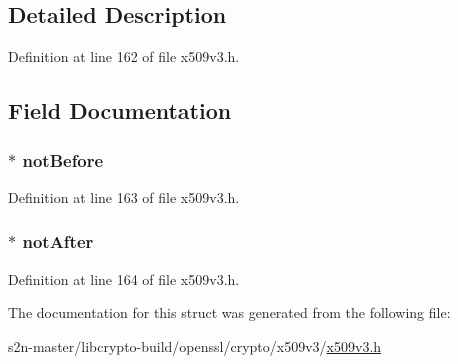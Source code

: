 \subsection{Detailed Description}


Definition at line 162 of file x509v3.\+h.



\subsection{Field Documentation}
\subsubsection[{\texorpdfstring{not\+Before}{notBefore}}]{ $\ast$ not\+Before}\hypertarget{struct_p_k_e_y___u_s_a_g_e___p_e_r_i_o_d__st_a1f4540963c9c687c144bd3125d351f50}{}\label{struct_p_k_e_y___u_s_a_g_e___p_e_r_i_o_d__st_a1f4540963c9c687c144bd3125d351f50}


Definition at line 163 of file x509v3.\+h.

\subsubsection[{\texorpdfstring{not\+After}{notAfter}}]{ $\ast$ not\+After}\hypertarget{struct_p_k_e_y___u_s_a_g_e___p_e_r_i_o_d__st_a2edd51bc270d6c8a89d3f455d91b90a8}{}\label{struct_p_k_e_y___u_s_a_g_e___p_e_r_i_o_d__st_a2edd51bc270d6c8a89d3f455d91b90a8}


Definition at line 164 of file x509v3.\+h.



The documentation for this struct was generated from the following file\+:\begin{DoxyCompactItemize}
\item 
s2n-\/master/libcrypto-\/build/openssl/crypto/x509v3/\hyperlink{crypto_2x509v3_2x509v3_8h}{x509v3.\+h}\end{DoxyCompactItemize}
